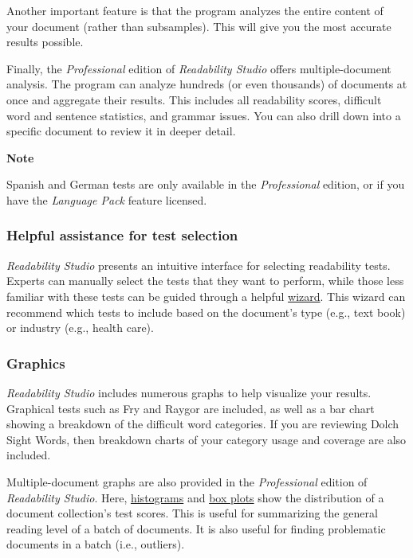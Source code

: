 \documentclass[
]{book}
\newenvironment{notesection}
    {
    \begin{tcolorbox}[colframe=mediumblue,colback=lightblue,coltext=mediumblue,arc=3mm]
    \faLightbulb[regular] \textbf{Note} \newline
    }
    {
    \end{tcolorbox}
    }
\theoremstyle{definition}
\theoremstyle{definition}
\theoremstyle{definition}
\theoremstyle{definition}
\theoremstyle{remark}
\begin{document}
Another important feature is that the program analyzes the entire content of your document (rather than subsamples). This will give you the most accurate results possible.

Finally, the \emph{Professional} edition of \emph{Readability Studio} offers multiple-document analysis. The program can analyze hundreds (or even thousands) of documents at once and aggregate their results. This includes all readability scores, difficult word and sentence statistics, and grammar issues. You can also drill down into a specific document to review it in deeper detail.

\begin{notesection}
Spanish and German tests are only available in the \emph{Professional} edition, or if you have the \emph{Language Pack} feature licensed.

\end{notesection}

\hypertarget{helpful-assistance-for-test-selection}{%
\subsubsection*{Helpful assistance for test selection}\label{helpful-assistance-for-test-selection}}

\emph{Readability Studio} presents an intuitive interface for selecting readability tests. Experts can manually select the tests that they want to perform, while those less familiar with these tests can be guided through a helpful \protect\hyperlink{creating-standard-project}{wizard}. This wizard can recommend which tests to include based on the document's type (e.g., text book) or industry (e.g., health care).

\hypertarget{graphics}{%
\subsubsection*{Graphics}\label{graphics}}

\emph{Readability Studio} includes numerous graphs to help visualize your results. Graphical tests such as Fry and Raygor are included, as well as a bar chart showing a breakdown of the difficult word categories. If you are reviewing Dolch Sight Words, then breakdown charts of your category usage and coverage are also included.

Multiple-document graphs are also provided in the \emph{Professional} edition of \emph{Readability Studio}. Here, \protect\hyperlink{reviewing-batch-histograms}{histograms} and \protect\hyperlink{reviewing-batch-box-plots}{box plots} show the distribution of a document collection's test scores. This is useful for summarizing the general reading level of a batch of documents. It is also useful for finding problematic documents in a batch (i.e., outliers).
\end{document}
